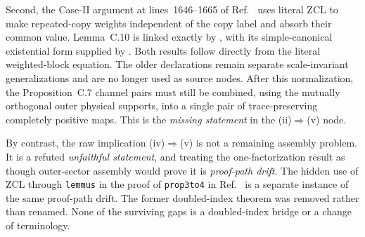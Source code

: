 \documentclass{article}
\begin{document}
Second, the Case-II argument at lines~1646--1665 of
Ref.~\cite{Cirac2016MPDO_arXiv} uses literal ZCL to make repeated-copy weights
independent of the copy label and absorb their common value. Lemma~C.10 is
linked exactly by
, with
its simple-canonical existential form supplied by
.
Both results follow directly from the literal weighted-block equation. The
older  declarations remain separate scale-invariant
generalizations and are no longer used as source nodes. After this
normalization, the Proposition~C.7 channel pairs must still be combined,
using the mutually orthogonal outer physical supports, into a single pair of
trace-preserving completely positive maps. This is the \emph{missing
statement} in the (ii)$\Rightarrow$(v) node.

By contrast, the raw implication (iv)$\Rightarrow$(v) is not a remaining
assembly problem. It is a refuted \emph{unfaithful statement}, and treating
the one-factorization result as though outer-sector assembly would prove it is
\emph{proof-path drift}. The hidden use of ZCL through
\texttt{lemmus} in the proof of \texttt{prop3to4} in
Ref.~\cite{Cirac2016MPDO_arXiv} is a separate instance of the same proof-path
drift. The former doubled-index theorem was removed rather than renamed. None
of the surviving gaps is a doubled-index bridge or a change of terminology.



\end{document}

